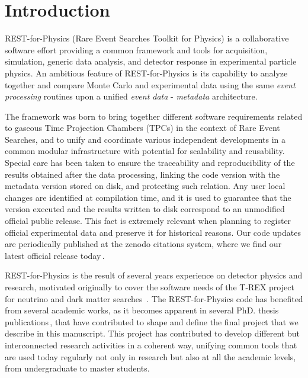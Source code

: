 \section{Introduction}
\label{sec:intro}



REST-for-Physics (Rare Event Searches Toolkit for Physics) is a collaborative software effort providing a common framework and tools for acquisition, simulation, generic data analysis, and detector response in experimental particle physics. An ambitious feature of REST-for-Physics is its capability to analyze together and compare Monte Carlo and experimental data using the same \emph{event processing} routines upon a unified \emph{event data} - \emph{metadata} architecture. 

The framework was born to bring together different software requirements related to gaseous Time Projection Chambers (TPCs) in the context of Rare Event Searches, and to unify and coordinate various independent developments in a common modular infrastructure with potential for scalability and reusability. Special care has been taken to ensure the traceability and reproducibility of the results obtained after the data processing, linking the code version with the metadata version stored on disk, and protecting such relation. Any user local changes are identified at compilation time, and it is used to guarantee that the version executed and the results written to disk correspond to an unmodified official public release. This fact is extremely relevant when planning to register official experimental data and preserve it for historical reasons. Our code updates are periodically published at the zenodo citations system, where we find our latest official release today\,\cite{javier_galan_2021_5092550}.

REST-for-Physics is the result of several years experience on detector physics and research, motivated originally to cover the software needs of the T-REX project for neutrino and dark matter searches~\cite{Irastorza:2015dcb,Irastorza:2015geo}. The REST-for-Physics code has benefited from several academic works, as it becomes apparent in several PhD. thesis publications\,\cite{IguazThesis,tomas2013development,SeguiThesis,HerreraThesis,GraciaThesis, GarciaPascualThesis, RuizThesis}, that have contributed to shape and define the final project that we describe in this manuscript.
This project has contributed to develop different but interconnected research activities in a coherent way, unifying common tools that are used today regularly not only in research but also at all the academic levels, from undergraduate to master students. 

